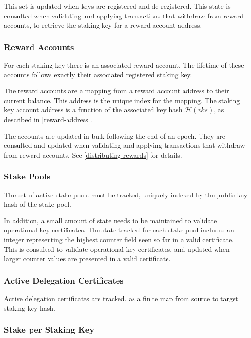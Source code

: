 \documentclass[11pt,a4paper]{article}
\begin{document}
This set is updated when keys are registered and de-registered. This
state is consulted when validating and applying transactions that
withdraw from reward accounts, to retrieve the staking key for a reward
account address.

\subsubsection{Reward Accounts}
\label{reward-accounts}

For each staking key there is an associated reward account. The lifetime of
these accounts follows exactly their associated registered staking key.

The reward accounts are a mapping from a reward account address to
their current balance. This address is the unique index for the mapping.
The staking key account address is a function of the associated key hash
\(\mathcal{H}(vks)\), as described in \cref{reward-address}.

The accounts are updated in bulk following the end of an epoch. They are
consulted and updated when validating and applying transactions that
withdraw from reward accounts. See \cref{distributing-rewards} for
details.

\subsubsection{Stake Pools}
\label{stake-pools}

The set of active stake pools must be tracked, uniquely indexed
by the public key hash of the stake pool.

In addition, a small amount of state needs to be maintained to validate
operational key certificates. The state tracked for each stake pool includes
an integer representing the highest counter field seen so far in a valid
certificate. This is consulted to validate operational key certificates, and
updated when larger counter values are presented in a valid certificate.

\subsubsection{Active Delegation Certificates}
\label{active-delegation-certificates}

Active delegation certificates are tracked, as a finite map from
source to target staking key hash.

\subsubsection{Stake per Staking Key}
\label{stake-per-staking-key}
\end{document}
